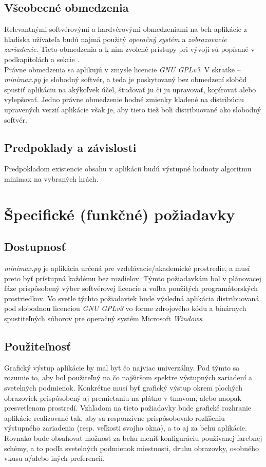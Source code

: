\documentclass{article}
\begin{document}
\subsection{Všeobecné obmedzenia}\label{subsec:constraints}
Relevantnými softvérovými a hardvérovými obmedzeniami na beh aplikácie z hľadiska užívateľa budú najmä použitý \emph{operačný systém} a \emph{zobrazovacie zariadenie}. Tieto obmedzenia a k nim zvolené prístupy pri vývoji sú popísané v podkapitolách  a  sekcie .\\
Právne obmedzenia sa aplikujú v zmysle licencie \emph{GNU GPLv3}. V skratke – \emph{minimax.py} je slobodný softvér, a teda je poskytovaný bez obmedzení slobôd spustiť aplikáciu na akýkoľvek účel, študovať ju či ju upravovať, kopírovať alebo vylepšovať. Jedno právne obmedzenie hodné zmienky kladené na distribúciu upravených verzií aplikácie však je, aby tieto tiež boli distribuované ako slobodný softvér.

\subsection{Predpoklady a závislosti}\label{subsec:premise}
Predpokladom existencie obsahu v aplikácii budú výstupné hodnoty algoritmu minimax na vybraných hrách.
\newpage

\section{Špecifické (funkčné) požiadavky}\label{sec:specific}
\subsection{Dostupnosť}\label{subsec:availability}
\emph{minimax.py} je aplikácia určená pre vzdelávacie/akademické prostredie, a musí preto byť prístupná každému bez rozdielov. Týmto požiadavkám bol v plánovacej fáze prispôsobený výber softvérovej licencie a voľba použitých programátorských prostriedkov.
Vo svetle týchto požiadaviek bude výsledná aplikácia distribuovaná pod slobodnou licenciou \emph{GNU GPLv3} vo forme zdrojového kódu a binárnych spustiteľných súborov pre operačný systém Microsoft \emph{Windows}.

\subsection{Použiteľnosť}\label{subsec:usability}
Grafický výstup aplikácie by mal byť čo najviac univerzálny. Pod týmto sa rozumie to, aby bol použiteľný na čo najširšom spektre výstupných zariadení a svetelných podmienok. Konkrétne musí byť grafický výstup okrem plochých obrazoviek prispôsobený aj premietaniu na plátno v tmavom, alebo naopak presvetlenom prostredí.
Vzhľadom na tieto požiadavky bude grafické rozhranie aplikácie realizované tak, aby sa responzívne prispôsobovalo rozlíšeniu výstupného zariadenia (resp. veľkosti svojho okna), a to aj za behu aplikácie.
Rovnako bude obsahovať možnosť za behu meniť konfiguráciu používanej farebnej schémy, a to podľa svetelných podmienok miestnosti, druhu obrazovky, osobného vkusu a/alebo iných preferencií.
\end{document}
